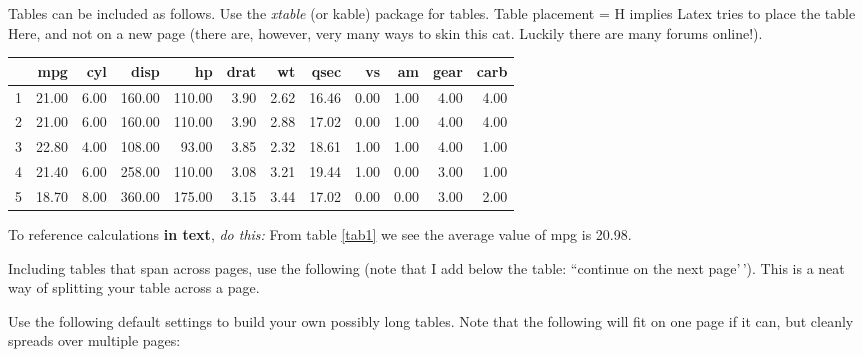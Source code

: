\documentclass[11pt,preprint, authoryear]{elsarticle}
\let\origtable\table
\let\endorigtable\endtable
\renewenvironment{table}[1][2] {
    \expandafter\origtable\expandafter[H]
} {
    \endorigtable
}
\numberwithin{equation}{section}
\numberwithin{figure}{section}
\numberwithin{table}{section}
\begin{document}
Tables can be included as follows. Use the \emph{xtable} (or kable)
package for tables. Table placement = H implies Latex tries to place the
table Here, and not on a new page (there are, however, very many ways to
skin this cat. Luckily there are many forums online!).

\begin{table}[H]
\centering
\begin{tabular}{rrrrrrrrrrrr}
  \hline
 & mpg & cyl & disp & hp & drat & wt & qsec & vs & am & gear & carb \\ 
  \hline
1 & 21.00 & 6.00 & 160.00 & 110.00 & 3.90 & 2.62 & 16.46 & 0.00 & 1.00 & 4.00 & 4.00 \\ 
  2 & 21.00 & 6.00 & 160.00 & 110.00 & 3.90 & 2.88 & 17.02 & 0.00 & 1.00 & 4.00 & 4.00 \\ 
  3 & 22.80 & 4.00 & 108.00 & 93.00 & 3.85 & 2.32 & 18.61 & 1.00 & 1.00 & 4.00 & 1.00 \\ 
  4 & 21.40 & 6.00 & 258.00 & 110.00 & 3.08 & 3.21 & 19.44 & 1.00 & 0.00 & 3.00 & 1.00 \\ 
  5 & 18.70 & 8.00 & 360.00 & 175.00 & 3.15 & 3.44 & 17.02 & 0.00 & 0.00 & 3.00 & 2.00 \\ 
   \hline
\end{tabular}
\caption{Short Table Example \label{tab1}} 
\end{table}

To reference calculations \textbf{in text}, \emph{do this:} From table
\ref{tab1} we see the average value of mpg is 20.98.

Including tables that span across pages, use the following (note that I
add below the table: ``continue on the next page'\,'). This is a neat
way of splitting your table across a page.

Use the following default settings to build your own possibly long
tables. Note that the following will fit on one page if it can, but
cleanly spreads over multiple pages:
\end{document}
